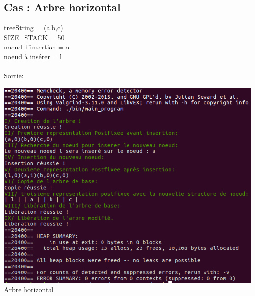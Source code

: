 \documentclass[a4paper]{article}
\begin{document}
\subsection{Cas : Arbre horizontal}
treeString = (a,b,c)
\\ 
SIZE\_STACK = 50
\\
noeud d'insertion = a
\\
noeud à insérer = l
\\
\\
\underline{Sortie: }
\begin{center}
\includegraphics[scale=0.6]{horizontal.png}
\\
Arbre horizontal
\end{center}
\end{document}
